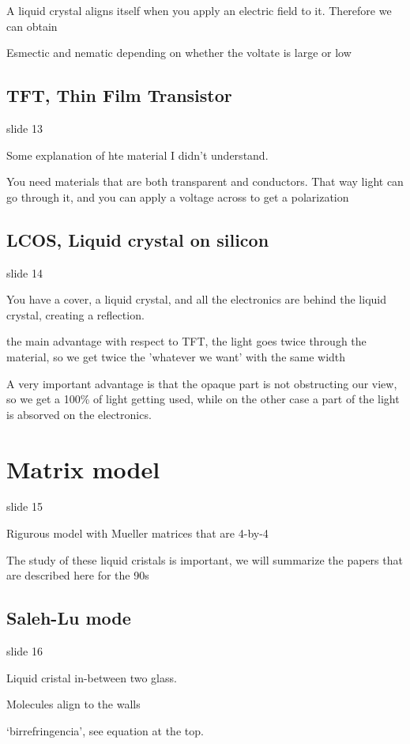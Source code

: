\documentclass[../main/main.tex]{subfiles}
\begin{document}
A liquid crystal aligns itself when you apply an electric field to it. Therefore we can obtain

Esmectic and nematic depending on whether the voltate is large or low

\subsection{TFT, Thin Film Transistor}
slide 13

Some explanation of hte material I didn't understand.

You need materials that are both transparent and conductors. That way light can go through it, and you can apply a voltage across to get a polarization

\subsection{LCOS, Liquid crystal on silicon}

slide 14

You have a cover, a liquid crystal, and all the electronics are behind the liquid crystal, creating a reflection.

the main advantage with respect to TFT, the light goes twice through the material, so we get twice the 'whatever we want' with the same width

A very important advantage is that the opaque part is not obstructing our view, so we get a 100\% of light getting used, while on the other case a part of the light is absorved on the electronics.

\section{Matrix model}
slide 15

Rigurous model with Mueller matrices that are 4-by-4

The study of these liquid cristals is important, we will summarize the papers that are described here for the 90s


\subsection{Saleh-Lu mode}

slide 16

Liquid cristal in-between two glass.

Molecules align to the walls

`birrefringencia', see equation at the top.
\end{document}
